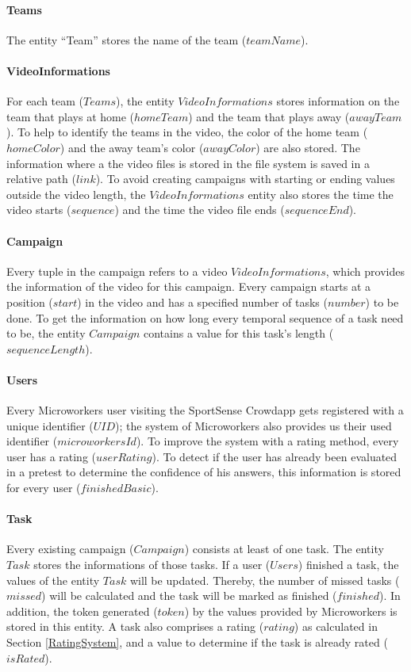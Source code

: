 \paragraph{Teams}
The entity “Team” stores the name of the team ($teamName$).

\paragraph{VideoInformations}

For each team ($Teams$), the entity $VideoInformations$ stores information on the team that plays at home ($homeTeam$) and the team that plays away ($awayTeam$). To help to identify the teams in the video, the color of the home team ($homeColor$) and the away team's color ($awayColor$) are also stored.
The information where a the video files is stored in the file system is saved in a relative path ($link$). 
To avoid creating campaigns with starting or ending values outside the video length, the $VideoInformations$ entity also stores the time the video starts ($sequence$) and the time the video file ends ($sequenceEnd$).

\paragraph{Campaign}
Every tuple in the campaign refers to a video $VideoInformations$, which provides the information of the video for this campaign. Every campaign starts at a position ($start$) in the video and has a specified number of tasks ($number$) to be done. To get the information on how long every temporal sequence of a task need to be, the entity $Campaign$ contains a value for this task's length ($sequenceLength$).

\paragraph{Users}
Every Microworkers user visiting the SportSense Crowdapp gets registered with a unique identifier ($UID$); the system of Microworkers also provides us their used identifier ($microworkersId$). To improve the system with a rating method, every user has a rating ($userRating$).
To detect if the user has already been evaluated in a pretest to determine the confidence of his answers, this information is stored for every user ($finishedBasic$).

\paragraph{Task}
Every existing campaign ($Campaign$) consists at least of one task. The entity $Task$ stores the informations of those tasks.
If a user ($Users$) finished a task, the values of the entity $Task$ will be updated. Thereby, the number of missed tasks ($missed$) will be calculated and the task will be marked as finished ($finished$). In addition, the token generated ($token$) by the values provided by Microworkers is stored in this entity.
A task also comprises a rating ($rating$) as calculated in Section \ref{RatingSystem}, and a value to determine if the task is already rated ($isRated$).

